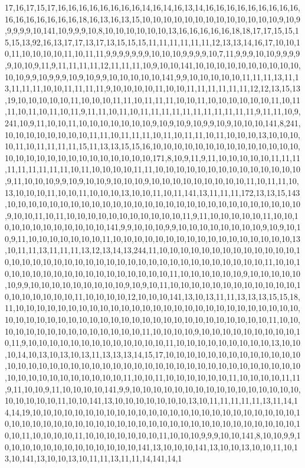 17,16,17,15,17,16,16,16,16,16,16,16,16,14,16,14,16,13,14,16,16,16,16,16,16,16,16,16,16,16,16,16,16,16,16,18,16,13,16,13,15,10,10,10,10,10,10,10,10,10,10,10,10,10,9,10,9,9,9,9,9,10,141,10,9,9,9,10,8,10,10,10,10,10,10,13,16,16,16,16,16,18,18,17,17,15,15,15,15,13,92,16,13,17,17,13,17,13,15,15,15,11,11,11,11,11,11,12,13,13,14,16,17,10,10,10,11,10,10,10,10,11,10,11,11,9,9,9,9,9,9,9,10,10,10,9,9,9,9,10,7,11,9,9,9,10,10,9,9,9,9,9,10,10,9,11,9,11,11,11,11,12,11,11,11,10,9,10,10,141,10,10,10,10,10,10,10,10,10,10,10,10,9,9,10,9,9,9,10,9,10,9,9,10,10,10,10,10,141,9,9,10,10,10,10,10,11,11,11,13,11,13,11,11,11,10,10,11,11,11,11,9,10,10,10,10,11,10,10,11,11,11,11,11,11,12,12,13,15,13,19,10,10,10,10,10,11,10,10,10,11,11,10,11,11,11,10,10,11,10,10,10,10,10,10,11,10,11,11,10,11,10,11,10,11,9,11,11,10,11,10,11,11,11,11,11,11,11,11,11,11,11,9,11,11,10,9,241,10,9,11,10,10,11,10,10,10,10,10,10,10,9,10,9,10,9,10,9,9,10,9,10,10,10,141,8,241,10,10,10,10,10,10,10,10,11,11,10,11,11,11,10,11,10,11,11,10,11,10,10,10,13,10,10,10,10,11,10,11,11,11,11,15,11,13,13,15,15,16,10,10,10,10,10,10,10,10,10,10,10,10,10,10,10,10,10,10,10,10,10,10,10,10,10,10,10,10,171,8,10,9,11,9,11,10,10,10,10,10,11,11,11,11,11,11,11,11,11,10,11,10,10,10,10,11,11,10,10,10,10,10,10,10,10,10,10,10,10,10,10,9,11,10,10,10,9,9,10,9,10,10,9,10,10,10,9,10,10,10,10,10,10,10,10,10,11,10,11,11,10,13,10,10,10,11,10,10,11,10,10,10,13,10,10,11,10,11,141,13,11,11,11,172,13,13,15,143,10,10,10,10,10,10,10,10,10,10,10,10,10,10,10,10,10,10,10,10,10,10,10,10,10,10,10,10,9,10,10,11,10,11,10,10,10,10,10,10,10,10,10,10,10,11,9,11,10,10,10,10,10,11,10,10,10,10,10,10,10,10,10,10,10,10,141,9,9,10,10,10,9,9,10,10,10,10,10,10,10,10,9,10,9,10,10,9,11,10,10,10,10,10,10,10,11,10,10,10,10,10,10,10,10,10,10,10,10,10,10,10,10,10,13,10,11,11,13,11,11,11,13,12,13,14,13,244,11,10,10,10,10,10,10,10,10,10,10,10,10,10,10,10,10,10,10,10,10,10,10,10,10,10,10,10,10,10,10,10,10,10,10,10,10,10,10,11,10,10,10,10,10,10,10,10,10,10,10,10,10,10,10,10,10,10,11,10,10,10,10,10,10,9,10,10,10,10,10,10,9,9,10,10,10,10,10,10,10,10,10,9,10,9,10,11,10,10,10,10,10,10,10,10,10,10,10,10,10,10,10,10,10,10,10,11,10,10,10,10,12,10,10,10,141,13,10,13,11,11,13,13,13,15,15,18,11,10,10,10,10,10,10,10,10,10,10,10,10,10,10,10,10,10,10,10,10,10,10,10,10,10,10,10,10,10,10,10,10,10,10,10,10,10,10,10,10,10,10,10,10,10,10,10,10,10,10,10,10,11,10,10,10,10,10,10,10,10,10,10,10,10,10,10,10,11,10,10,10,10,9,10,10,10,10,10,10,10,10,10,10,11,9,10,10,10,10,10,10,10,10,10,10,10,10,10,11,10,10,10,10,10,10,10,10,10,13,10,10,10,14,10,13,10,13,10,13,11,13,13,13,14,15,17,10,10,10,10,10,10,10,10,10,10,10,10,10,10,10,10,10,10,10,10,10,10,10,10,10,10,10,10,10,10,10,10,10,10,10,10,10,10,10,10,10,10,10,10,10,10,10,10,10,10,10,10,11,10,10,11,10,10,10,10,10,10,11,10,10,10,10,11,11,9,11,10,10,9,11,10,10,10,10,141,9,9,10,10,10,10,10,10,10,10,10,10,10,10,10,10,10,10,10,10,10,10,10,11,10,10,141,13,10,10,10,10,10,10,10,13,10,11,11,11,11,11,13,11,14,14,14,19,10,10,10,10,10,10,10,10,10,10,10,10,10,10,10,10,10,10,10,10,10,10,10,10,10,10,10,10,10,10,10,10,10,10,10,10,10,10,10,10,10,10,10,10,10,10,10,10,10,10,10,10,10,10,10,11,10,10,10,10,11,10,10,10,10,10,10,10,11,10,10,10,9,9,9,10,10,141,8,10,10,9,9,10,10,10,10,10,10,10,10,10,10,10,10,10,141,13,10,10,10,141,13,10,10,13,10,10,11,10,13,10,141,13,10,10,13,10,11,11,13,11,11,14,141,14,1